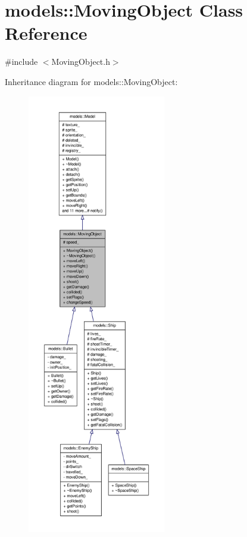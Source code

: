 \hypertarget{classmodels_1_1MovingObject}{\section{models\-:\-:\-Moving\-Object \-Class \-Reference}
\label{d7/d35/classmodels_1_1MovingObject}
}


{\ttfamily \#include $<$\-Moving\-Object.\-h$>$}



\-Inheritance diagram for models\-:\-:\-Moving\-Object\-:
\nopagebreak
\begin{figure}[H]
\begin{center}
\leavevmode
\includegraphics[height=550pt]{df/d17/classmodels_1_1MovingObject__inherit__graph}
\end{center}
\end{figure}


